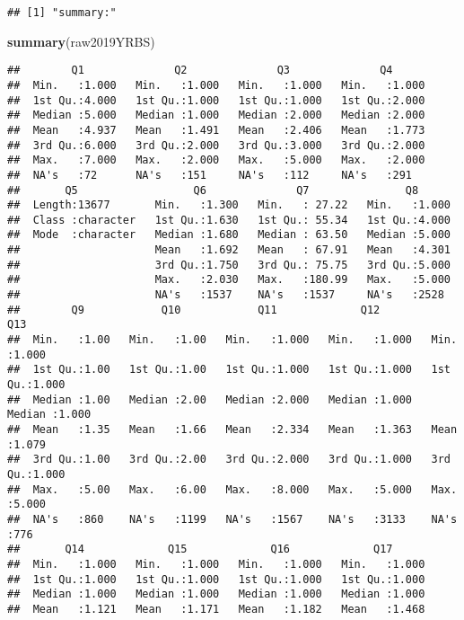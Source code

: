 \documentclass[
]{article}
\newenvironment{Shaded}{\begin{snugshade}}{\end{snugshade}}
\newcommand{\FunctionTok}[1]{\textcolor[rgb]{0.13,0.29,0.53}{\textbf{#1}}}
\newcommand{\NormalTok}[1]{#1}
\begin{document}
\begin{verbatim}
## [1] "summary:"
\end{verbatim}

\begin{Shaded}
\begin{Highlighting}[]
\FunctionTok{summary}\NormalTok{(raw2019YRBS)}
\end{Highlighting}
\end{Shaded}

\begin{verbatim}
##        Q1              Q2              Q3              Q4       
##  Min.   :1.000   Min.   :1.000   Min.   :1.000   Min.   :1.000  
##  1st Qu.:4.000   1st Qu.:1.000   1st Qu.:1.000   1st Qu.:2.000  
##  Median :5.000   Median :1.000   Median :2.000   Median :2.000  
##  Mean   :4.937   Mean   :1.491   Mean   :2.406   Mean   :1.773  
##  3rd Qu.:6.000   3rd Qu.:2.000   3rd Qu.:3.000   3rd Qu.:2.000  
##  Max.   :7.000   Max.   :2.000   Max.   :5.000   Max.   :2.000  
##  NA's   :72      NA's   :151     NA's   :112     NA's   :291    
##       Q5                  Q6              Q7               Q8       
##  Length:13677       Min.   :1.300   Min.   : 27.22   Min.   :1.000  
##  Class :character   1st Qu.:1.630   1st Qu.: 55.34   1st Qu.:4.000  
##  Mode  :character   Median :1.680   Median : 63.50   Median :5.000  
##                     Mean   :1.692   Mean   : 67.91   Mean   :4.301  
##                     3rd Qu.:1.750   3rd Qu.: 75.75   3rd Qu.:5.000  
##                     Max.   :2.030   Max.   :180.99   Max.   :5.000  
##                     NA's   :1537    NA's   :1537     NA's   :2528   
##        Q9            Q10            Q11             Q12             Q13       
##  Min.   :1.00   Min.   :1.00   Min.   :1.000   Min.   :1.000   Min.   :1.000  
##  1st Qu.:1.00   1st Qu.:1.00   1st Qu.:1.000   1st Qu.:1.000   1st Qu.:1.000  
##  Median :1.00   Median :2.00   Median :2.000   Median :1.000   Median :1.000  
##  Mean   :1.35   Mean   :1.66   Mean   :2.334   Mean   :1.363   Mean   :1.079  
##  3rd Qu.:1.00   3rd Qu.:2.00   3rd Qu.:2.000   3rd Qu.:1.000   3rd Qu.:1.000  
##  Max.   :5.00   Max.   :6.00   Max.   :8.000   Max.   :5.000   Max.   :5.000  
##  NA's   :860    NA's   :1199   NA's   :1567    NA's   :3133    NA's   :776    
##       Q14             Q15             Q16             Q17       
##  Min.   :1.000   Min.   :1.000   Min.   :1.000   Min.   :1.000  
##  1st Qu.:1.000   1st Qu.:1.000   1st Qu.:1.000   1st Qu.:1.000  
##  Median :1.000   Median :1.000   Median :1.000   Median :1.000  
##  Mean   :1.121   Mean   :1.171   Mean   :1.182   Mean   :1.468  

\end{verbatim}
\end{document}
